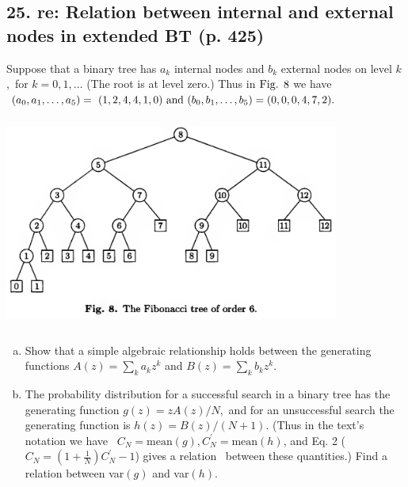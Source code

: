 \documentclass[fontsize=11pt, paper=a4]{scrartcl}
\begin{document}
\subsection*{25. re: Relation between internal and external nodes in extended BT (p. 425)}\label{num: 25}
\parbox{\linewidth}{
    \qquad Suppose that a binary tree has $a_{k}$ internal nodes and $b_{k}$ external nodes on level $k$,\ 
    for $k=0,1,\dotsc$ (The root is at level zero.) Thus in $\text{Fig.\space} 8$ we have $(a_{0},a_{1},\dotsc,a_{5}) =\
    (1,2,4,4,1,0) \text{\space and\space} (b_{0}, b_{1}, \dotsc, b_{5}) = (0,0,0,4,7,2).$}
\begin{center}
 \includegraphics[height=7cm,width=11cm]{figure8.png}
\end{center}
\begin{enumerate}[(a), leftmargin=1.5cm]
    \item Show that a simple algebraic relationship holds between the generating functions $A(z)=\sum_k a_{k}z^{k}$ and $B(z)=\sum_k b_{k}z^{k}$.
    \item The probability distribution for a successful search in a binary tree has the generating function $g(z) = zA(z)/N$,\
            and for an unsuccessful search the generating function is $h(z) = B(z)/(N + 1)$. (Thus in the text’s notation we have \ 
            $C_{N} = \text{mean}(g), C^{'}_{N} = \text{mean}(h)$, and Eq. 2 ($C_{N}=(1+\frac{1}{N})C^{'}_{N}-1$) gives a relation \ 
            between these quantities.) Find a relation between var$(g)$ and var$(h)$.
\end{enumerate}
\end{document}
